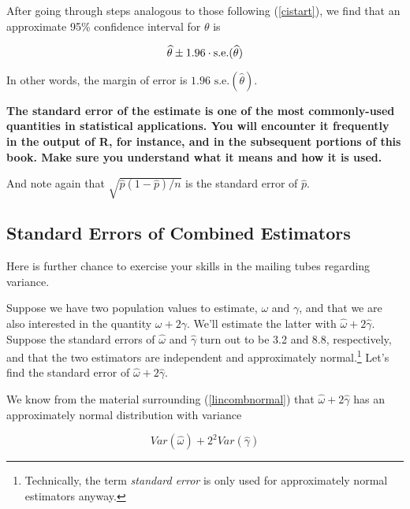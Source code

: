 After going through steps analogous to those following (\ref{cistart}),
we find that an approximate 95\% confidence interval for $\theta$ is

\begin{equation}
\label{genci}
\widehat{\theta} \pm 1.96 \cdot {\rm s.e.}(\widehat{\theta})
\end{equation}

In other words, the margin of error is $1.96 \textrm{ s.e.}(\widehat{\theta})$.

{\bf The standard error of the estimate is one of the most commonly-used
quantities in statistical applications.  You will encounter it
frequently in the output of R, for instance, and in the subsequent
portions of this book.  Make sure you understand what it means and how
it is used.} 

And note again that $\sqrt{\widehat{p} (1-\widehat{p})/n}$ is the
standard error of $\widehat{p}$.

\subsection{Standard Errors of Combined Estimators}

Here is further chance to exercise your skills in the mailing tubes
regarding variance.

Suppose we have two population values to estimate, $\omega$ and
$\gamma$, and that we are also interested in the quantity $\omega + 2
\gamma$.  We'll estimate the latter with $\hat{\omega} + 2
\hat{\gamma}$.  Suppose the standard errors of $\hat{\omega}$ and
$\hat{\gamma}$ turn out to be 3.2 and 8.8, respectively, and that the
two estimators are independent and approximately
normal.\footnote{Technically, the term {\it standard error} is only used
for approximately normal estimators anyway.}
Let's find the standard error of
$\hat{\omega} + 2 \hat{\gamma}$.

We know from the material surrounding (\ref{lincombnormal}) that 
$\hat{\omega} + 2 \hat{\gamma}$ has an approximately normal distribution
with variance

\begin{equation}
Var(\hat{\omega}) + 2^2 Var(\hat{\gamma})
\end{equation}

% 

